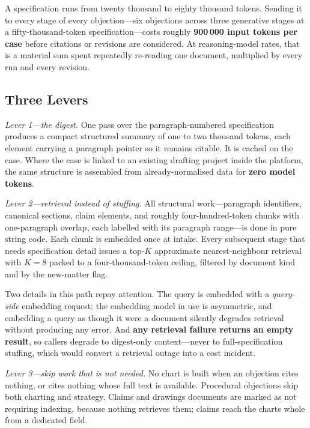 \documentclass[conference]{IEEEtran}
\begin{document}
A specification runs from twenty thousand to eighty thousand tokens. Sending it to every stage of every objection---six objections across three generative stages at a fifty-thousand-token specification---costs roughly \textbf{900\,000 input tokens per case} before citations or revisions are considered. At reasoning-model rates, that is a material sum spent repeatedly re-reading one document, multiplied by every run and every revision.

\subsection{Three Levers}

\emph{Lever 1---the digest.} One pass over the paragraph-numbered specification produces a compact structured summary of one to two thousand tokens, each element carrying a paragraph pointer so it remains citable. It is cached on the case. Where the case is linked to an existing drafting project inside the platform, the same structure is assembled from already-normalised data for \textbf{zero model tokens}.

\emph{Lever 2---retrieval instead of stuffing.} All structural work---paragraph identifiers, canonical sections, claim elements, and roughly four-hundred-token chunks with one-paragraph overlap, each labelled with its paragraph range---is done in pure string code. Each chunk is embedded once at intake. Every subsequent stage that needs specification detail issues a top-$K$ approximate nearest-neighbour retrieval \cite{malkov2020} with $K=8$ packed to a four-thousand-token ceiling, filtered by document kind and by the new-matter flag.

Two details in this path repay attention. The query is embedded with a \emph{query-side} embedding request: the embedding model in use is asymmetric, and embedding a query as though it were a document silently degrades retrieval without producing any error. And \textbf{any retrieval failure returns an empty result}, so callers degrade to digest-only context---never to full-specification stuffing, which would convert a retrieval outage into a cost incident.

\emph{Lever 3---skip work that is not needed.} No chart is built when an objection cites nothing, or cites nothing whose full text is available. Procedural objections skip both charting and strategy. Claims and drawings documents are marked as not requiring indexing, because nothing retrieves them; claims reach the charts whole from a dedicated field.
\end{document}
